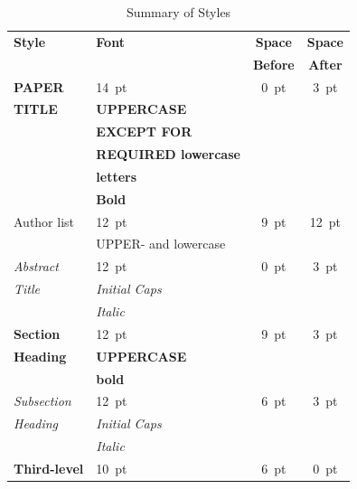 \documentclass[a4paper,
              ]{jacow}
\begin{document}
\begin{table}[h!t]
	\setlength\tabcolsep{3.5pt}
	\centering
	\caption{Summary of Styles}
	\label{style-tab}
	\begin{tabular}{llcc}
		\toprule
		\textbf{Style} & \textbf{Font}               & \textbf{Space}  & \textbf{Space} \\
		&                             & \textbf{Before} & \textbf{After} \\
		\midrule
		\textbf{PAPER}  & \SI{14}{pt}                 & \SI{0}{pt}      & \SI{3}{pt}  \\
		\textbf{TITLE}  & \textbf{UPPERCASE}          &                 &      \\
		& \textbf{EXCEPT FOR}         &                 &      \\
		& \textbf{REQUIRED lowercase} &                 &      \\
		& \textbf{letters}            &                 &      \\
		& \textbf{Bold}               &                 &      \\[5pt]
		Author list  & \SI{12}{pt}                 & \SI{9}{pt}      & \SI{12}{pt} \\
		& UPPER- and lowercase        &                 &      \\[5pt]
		\textit{Abstract} & \SI{12}{pt}                 & \SI{0}{pt}      & \SI{3}{pt} \\
		\textit{Title}  & \textit{Initial Caps}       &                 &      \\
		& \textit{Italic}             &                 &      \\[5pt]
		\textbf{Section}  & \SI{12}{pt}                 & \SI{9}{pt}      & \SI{3}{pt}  \\
		\textbf{Heading}  & \textbf{UPPERCASE}          &                 &      \\
		& \textbf{bold}               &                 &      \\[5pt]
		\textit{Subsection} & \SI{12}{pt}                 & \SI{6}{pt}      & \SI{3}{pt}  \\
		\textit{Heading}  & \textit{Initial Caps}       &                 &      \\
		& \textit{Italic}             &                 &      \\[5pt]
		\textbf{Third-level} & \SI{10}{pt}                 & \SI{6}{pt}      & \SI{0}{pt}  \\

\end{tabular}
\end{table}
\end{document}
